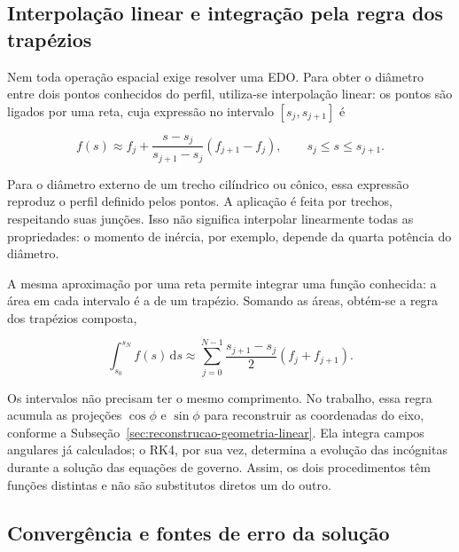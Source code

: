 \documentclass[arial,centeredequations,english,brazilian,oneside,section=TITLE]{ifes8}
\begin{document}
\subsection{Interpolação linear e integração pela regra dos trapézios}
\label{subsec:interpolacao-trapezios}

Nem toda operação espacial exige resolver uma EDO. Para obter o diâmetro entre
dois pontos conhecidos do perfil, utiliza-se interpolação linear: os pontos
são ligados por uma reta, cuja expressão no intervalo $[s_j,s_{j+1}]$ é
\cite{Chapra2011}

\begin{equation}
  f(s)\approx f_j+
    \frac{s-s_j}{s_{j+1}-s_j}(f_{j+1}-f_j),
  \qquad s_j\leq s\leq s_{j+1}.
  \label{eq:interpolacao-linear}
\end{equation}

Para o diâmetro externo de um trecho cilíndrico ou cônico, essa expressão
reproduz o perfil definido pelos pontos. A aplicação é feita por trechos,
respeitando suas junções. Isso não significa interpolar linearmente todas
as propriedades: o momento de inércia, por exemplo, depende da quarta
potência do diâmetro.

A mesma aproximação por uma reta permite integrar uma função conhecida:
a área em cada intervalo é a de um trapézio. Somando as áreas, obtém-se
a regra dos trapézios composta,

\begin{equation}
  \int_{s_0}^{s_N}f(s)\,\mathrm{d}s
    \approx\sum_{j=0}^{N-1}
      \frac{s_{j+1}-s_j}{2}(f_j+f_{j+1}).
  \label{eq:trapezios-composta}
\end{equation}

Os intervalos não precisam ter o mesmo comprimento. No trabalho, essa regra
acumula as projeções $\cos\phi$ e $\sin\phi$ para reconstruir as coordenadas
do eixo, conforme a Subseção~\ref{sec:reconstrucao-geometria-linear}.
Ela integra campos angulares já calculados; o RK4, por sua vez, determina
a evolução das incógnitas durante a solução das equações de governo.
Assim, os dois procedimentos têm funções distintas e não são substitutos
diretos um do outro.

\subsection{Convergência e fontes de erro da solução}
\label{subsec:convergencia-erros}
\end{document}
